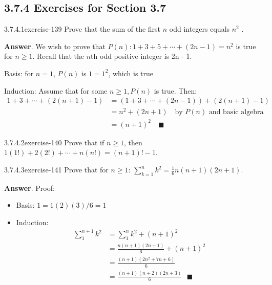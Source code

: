 \documentclass[twoside,10pt,]{book}
\numberwithin{equation}{section}
\begin{document}
\subsection*{3.7.4 Exercises for Section 3.7}
\begin{divisionsolution}{3.7.4.1}{}{exercise-139}%
\hypertarget{p-1342}{}%
Prove that the sum of the first \(n\) odd integers equals \(n^2\) .%
\par\smallskip%
\noindent\textbf{Answer}.\quad%
\hypertarget{p-1343}{}%
We wish to prove that \(P(n):1+3+5+\cdots +(2n-1)=n^2\) is true for \(n \geqslant 1\). Recall that the \(n\)th odd positive integer is 2n - 1.%
\par
\hypertarget{p-1344}{}%
Basis:  for \(n=1\), \(P(n)\) is \(1=1^2\), which is true%
\par
\hypertarget{p-1345}{}%
Induction:  Assume that for some \(n\geqslant 1, P(n)\) is true. Then:%
\begin{equation*}
\begin{split}
1+3+\cdots +(2(n+1)-1) &= (1+3+\cdots +(2n-1) ) +(2(n+1)-1)\\
& =n^2+(2n+1) \quad \textrm{by } P(n) \textrm{ and basic algebra}\\
& =(n+1)^2 \quad \blacksquare
\end{split}
\end{equation*}
%
\end{divisionsolution}%
\begin{divisionsolution}{3.7.4.2}{}{exercise-140}%
\hypertarget{p-1346}{}%
Prove that if \(n \geq  1\), then \(1(1!) + 2(2!) + \cdots  + n(n!) = (n + 1)! - 1\).%
\end{divisionsolution}%
\begin{divisionsolution}{3.7.4.3}{}{exercise-141}%
\hypertarget{p-1347}{}%
Prove that for \(n \geq  1\): \(\sum_{k=1}^n k^2= \frac{1}{6} n(n+1) (2 n+1)\).%
\par\smallskip%
\noindent\textbf{Answer}.\quad%
\hypertarget{p-1348}{}%
Proof:%
\par
\hypertarget{p-1349}{}%
\leavevmode%
\begin{itemize}[label=\textbullet]
\item{}Basis: \(1=1(2)(3)/6=1\)%
\item{}Induction:%
\begin{equation*}
\begin{split}
\sum_1^{n+1} k^2 &=\sum_1^n k^2+(n+1)^2\\
&=\frac{n(n+1)(2n+1)}{6}+(n+1)^2\\
&=\frac{(n+1)(2n^2+7n+6)}{6}\\
&=\frac{(n+1)(n+2)(2n+3)}{6}\textrm{   }\blacksquare\\
\end{split}
\end{equation*}
%
\end{itemize}
%
\end{divisionsolution}%
\end{document}
